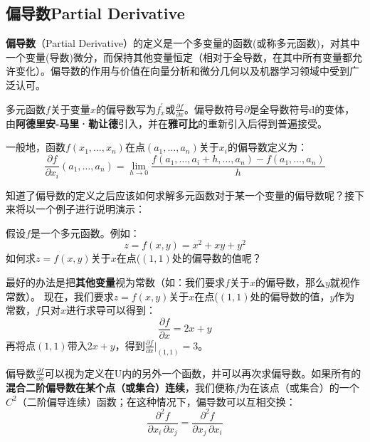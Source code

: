 \documentclass[UTF8]{ctexart}
\begin{document}
{\subsection{偏导数Partial Derivative}
\textbf{偏导数}（Partial Derivative）的定义是一个多变量的函数(或称多元函数)，对其中一个变量(导数)微分，而保持其他变量恒定（相对于全导数，在其中所有变量都允许变化）。偏导数的作用与价值在向量分析和微分几何以及机器学习领域中受到广泛认可。

多元函数$f$关于变量$x$的偏导数写为$f_x^{\prime}$或$\frac{\partial f}{\partial x}$。偏导数符号$\partial$是全导数符号$\text{d}$的变体，由\textbf{阿德里安-马里·勒让德}引入，并在\textbf{雅可比}的重新引入后得到普遍接受。
\begin{question}
	一般地，函数$f(x_1,...,x_n)$在点$(a_1,...,a_n)$关于$x_i$的偏导数定义为：
\begin{equation}
	\frac{\partial f}{\partial x_i} (a_1,\ldots ,a_n)=\lim_{h\to 0} \frac {f(a_1,\ldots ,a_i+h,\ldots ,a_n)-f(a_1,\ldots ,a_n)}{h}
\end{equation}
\end{question}
知道了偏导数的定义之后应该如何求解多元函数对于某一个变量的偏导数呢？接下来将以一个例子进行说明演示：

假设$f$是一个多元函数。例如：
\begin{equation}
	z = f(x, y) = x^2 + xy + y^2
\end{equation}如何求$z=f(x,y)$关于$x$在点($(1,1)$处的偏导数的值呢？
\begin{question}
	最好的办法是把\textbf{其他变量}视为常数（如：我们要求$f$关于$x$的偏导数，那么$y$就视作常数）。
	现在，我们要求$z=f(x,y)$关于$x$在点($(1,1)$处的偏导数的值，$y$作为常数，$f$只对$x$进行求导可以得到：
\begin{equation}
	\frac {\partial f}{\partial x}=2x+y
\end{equation}再将点$(1,1)$带入$2x+y$，得到$\frac {\partial f}{\partial x}|_{(1,1)}=3$。
\end{question}

\begin{info}
	偏导数$\frac{\partial f}{\partial x}$可以视为定义在U内的另外一个函数，并可以再次求偏导数。如果所有的\textbf{混合二阶偏导数在某个点（或集合）连续}，我们便称$f$为在该点（或集合）的一个$C^2$（二阶偏导连续）函数；在这种情况下，偏导数可以互相交换：
\begin{equation}
	\frac{\partial^2f}{\partial x_i\, \partial x_j} = \frac{\partial^2f} {\partial x_j\, \partial x_i}
\end{equation}
\end{info}

}
\end{document}
